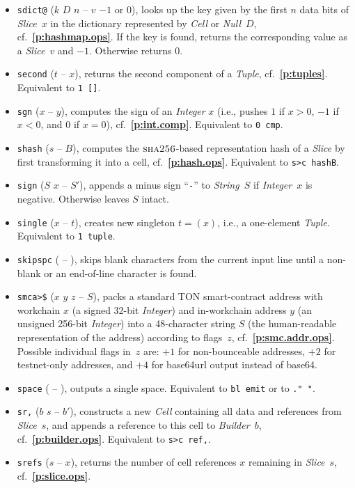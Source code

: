 \documentclass[12pt,oneside]{article}
\def\refpoint#1{{\rm\textbf{\ref{#1}}}}
\let\ptref=\refpoint
\def\opsc#1{\operatorname{\textsc{#1}}}
\def\Sha{\opsc{sha256}}
\begin{document}
\begin{itemize}
\item {\tt sdict@} ($k$ $D$ $n$ -- $v$ $-1$ or $0$), looks up the key given by the first $n$ data bits of {\em Slice\/}~$x$ in the dictionary represented by {\em Cell\/} or {\em Null\/}~$D$, cf.~\ptref{p:hashmap.ops}. If the key is found, returns the corresponding value as a {\em Slice\/}~$v$ and $-1$. Otherwise returns $0$.
\item {\tt second} ($t$ -- $x$), returns the second component of a {\em Tuple}, cf.~\ptref{p:tuples}. Equivalent to {\tt 1 []}.
\item {\tt sgn} ($x$ -- $y$), computes the sign of an {\em Integer\/} $x$ (i.e., pushes $1$ if $x>0$, $-1$ if $x<0$, and $0$ if $x=0$), cf.~\ptref{p:int.comp}. Equivalent to {\tt 0 cmp}.
\item {\tt shash} ($s$ -- $B$), computes the $\Sha$-based representation hash of a {\em Slice\/} by first transforming it into a cell, cf.~\ptref{p:hash.ops}. Equivalent to {\tt s>c hashB}.
\item {\tt sign} ($S$ $x$ -- $S'$), appends a minus sign ``{\tt -}'' to {\em String\/}~$S$ if {\em Integer\/}~$x$ is negative. Otherwise leaves $S$ intact.
\item {\tt single} ($x$ -- $t$), creates new singleton $t=(x)$, i.e., a one-element {\em Tuple}. Equivalent to {\tt 1 tuple}.
\item {\tt skipspc} ( -- ), skips blank characters from the current input line until a non-blank or an end-of-line character is found.
\item {\tt smca>\$} ($x$ $y$ $z$ -- $S$), packs a standard TON smart-contract address with workchain $x$ (a signed 32-bit {\em Integer\/}) and in-workchain address $y$ (an unsigned 256-bit {\em Integer\/}) into a 48-character string $S$ (the human-readable representation of the address) according to flags~$z$, cf.~\ptref{p:smc.addr.ops}. Possible individual flags in~$z$ are: $+1$ for non-bounceable addresses, $+2$ for testnet-only addresses, and $+4$ for base64url output instead of base64.
\item {\tt space} ( -- ), outputs a single space. Equivalent to {\tt bl emit} or to {\tt ." "}.
\item {\tt sr,} ($b$ $s$ -- $b'$), constructs a new {\em Cell\/} containing all data and references from {\em Slice\/}~$s$, and appends a reference to this cell to {\em Builder}~$b$, cf.~\ptref{p:builder.ops}. Equivalent to {\tt s>c ref,}.
\item {\tt srefs} ($s$ -- $x$), returns the number of cell references $x$ remaining in {\em Slice}~$s$, cf.~\ptref{p:slice.ops}.

\end{itemize}
\end{document}
